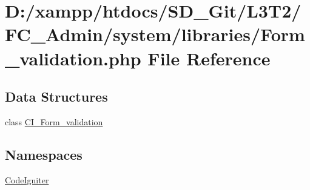 \hypertarget{_admin_2system_2libraries_2_form__validation_8php}{}\section{D\+:/xampp/htdocs/\+S\+D\+\_\+\+Git/\+L3\+T2/\+F\+C\+\_\+\+Admin/system/libraries/\+Form\+\_\+validation.php File Reference}
\label{_admin_2system_2libraries_2_form__validation_8php}
\subsection*{Data Structures}
\begin{DoxyCompactItemize}
\item 
class \hyperlink{class_c_i___form__validation}{C\+I\+\_\+\+Form\+\_\+validation}
\end{DoxyCompactItemize}
\subsection*{Namespaces}
\begin{DoxyCompactItemize}
\item 
 \hyperlink{namespace_code_igniter}{Code\+Igniter}
\end{DoxyCompactItemize}
